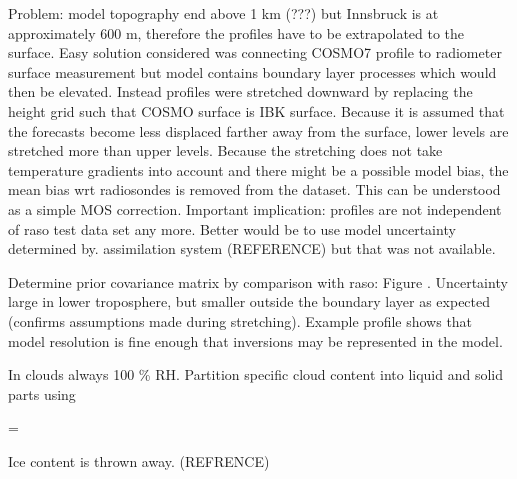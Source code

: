     Problem: model topography end above 1 km (???) but Innsbruck is at
    approximately 600 m, therefore the profiles have to be extrapolated to the
    surface. Easy solution considered was connecting COSMO7 profile to
    radiometer surface measurement but model contains boundary layer processes
    which would then be elevated. Instead profiles were stretched downward by
    replacing the height grid such that COSMO surface is IBK surface. Because
    it is assumed that the forecasts become less displaced farther away from
    the surface, lower levels are stretched more than upper levels. Because
    the stretching does not take temperature gradients into account and there
    might be a possible model bias, the mean bias wrt radiosondes is removed
    from the dataset. This can be understood as a simple MOS correction.
    Important implication: profiles are not independent of raso test data set
    any more. Better would be to use model uncertainty determined by.
    assimilation system (REFERENCE) but that was not available.

    Determine prior covariance matrix by comparison with raso: Figure
    . Uncertainty large in lower troposphere, but smaller
    outside the boundary layer as expected (confirms assumptions made during
    stretching). Example profile shows that model resolution is fine enough
    that inversions may be represented in the model.

    In clouds always 100 \% RH. Partition specific cloud content into liquid
    and solid parts using

    \startformula
        \QLIQ = \QCLOUD \startcases
              \KELVIN \le \TEMP \NR
            \NC \frac{\TEMP - 233.15 \KELVIN}{40 \KELVIN}
                 \KELVIN \lt \TEMP {} \KELVIN \NR
              \KELVIN \le \TEMP \NR
        \stopcases
    \stopformula

    Ice content is thrown away. (REFRENCE)

            {}


